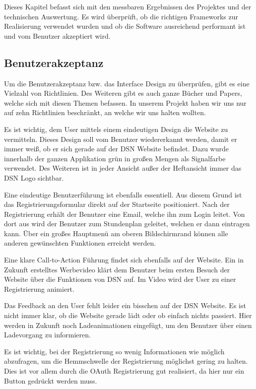 Dieses Kapitel befasst sich mit den messbaren Ergebnissen des Projektes und der technischen Auswertung. Es wird überprüft, ob die richtigen Frameworks zur Realisierung verwendet wurden und ob die Software ausreichend performant ist und vom Benutzer akzeptiert wird.

\subsection{Benutzerakzeptanz}
Um die Benutzerakzeptanz bzw. das Interface Design zu überprüfen, gibt es eine Vielzahl von Richtlinien. Des Weiteren gibt es auch ganze Bücher und Papers, welche sich mit diesen Themen befassen. In unserem Projekt haben wir uns nur auf zehn Richtlinien\cite{INTDES1} beschränkt, an welche wir uns halten wollten. 

Es ist wichtig, dem User mittels einem eindeutigen Design die Website zu vermitteln. Dieses Design soll vom Benutzer wiedererkannt werden, damit er immer weiß, ob er sich gerade auf der DSN Website befindet. Dazu wurde innerhalb der ganzen Applikation grün in großen Mengen als Signalfarbe verwendet. Des Weiteren ist in jeder Ansicht außer der Heftansicht immer das DSN Logo sichtbar.

Eine eindeutige Benutzerführung ist ebenfalls essentiell. Aus diesem Grund ist das Registrierungsformular direkt auf der Startseite positioniert. Nach der Registrierung erhält der Benutzer eine Email, welche ihn zum Login leitet. Von dort aus wird der Benutzer zum Stundenplan geleitet, welchen er dann eintragen kann. Über ein großes Hauptmenü am oberen Bildschirmrand können alle anderen gewünschten Funktionen erreicht werden.

Eine klare Call-to-Action Führung findet sich ebenfalls auf der Website. Ein in Zukunft erstelltes Werbevideo klärt dem Benutzer beim ersten Besuch der Website über die Funktionen von DSN auf. Im Video wird der User zu einer Registrierung animiert.

Das Feedback an den User fehlt leider ein bisschen auf der DSN Website. Es ist nicht immer klar, ob die Website gerade lädt oder ob einfach nichts passiert. Hier werden in Zukunft noch Ladeanimationen eingefügt, um den Benutzer über einen Ladevorgang zu informieren.

Es ist wichtig, bei der Registrierung so wenig Informationen wie möglich abzufragen, um die Hemmschwelle der Registrierung möglichst gering zu halten. Dies ist vor allem durch die OAuth Registrierung gut realisiert, da hier nur ein Button gedrückt werden muss.

